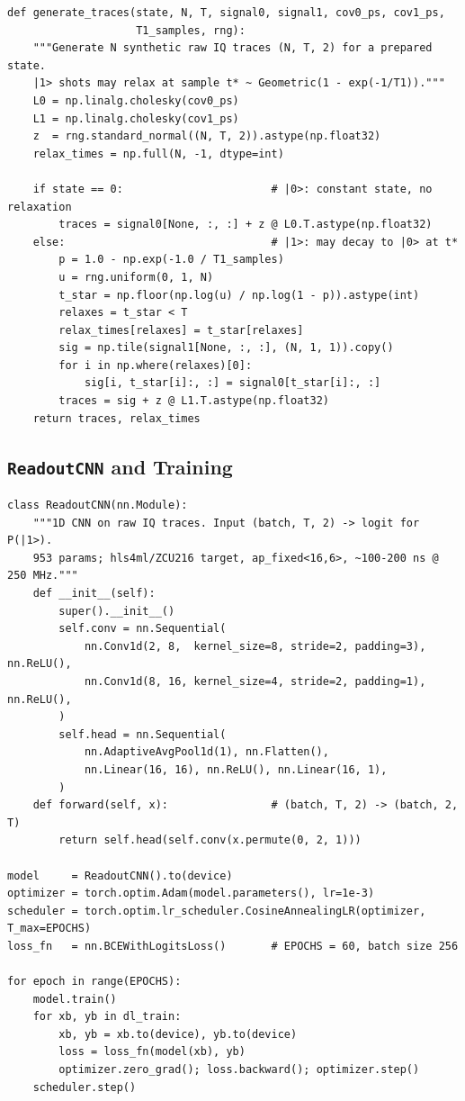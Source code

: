 \begin{verbatim}
def generate_traces(state, N, T, signal0, signal1, cov0_ps, cov1_ps,
                    T1_samples, rng):
    """Generate N synthetic raw IQ traces (N, T, 2) for a prepared state.
    |1> shots may relax at sample t* ~ Geometric(1 - exp(-1/T1))."""
    L0 = np.linalg.cholesky(cov0_ps)
    L1 = np.linalg.cholesky(cov1_ps)
    z  = rng.standard_normal((N, T, 2)).astype(np.float32)
    relax_times = np.full(N, -1, dtype=int)

    if state == 0:                       # |0>: constant state, no relaxation
        traces = signal0[None, :, :] + z @ L0.T.astype(np.float32)
    else:                                # |1>: may decay to |0> at t*
        p = 1.0 - np.exp(-1.0 / T1_samples)
        u = rng.uniform(0, 1, N)
        t_star = np.floor(np.log(u) / np.log(1 - p)).astype(int)
        relaxes = t_star < T
        relax_times[relaxes] = t_star[relaxes]
        sig = np.tile(signal1[None, :, :], (N, 1, 1)).copy()
        for i in np.where(relaxes)[0]:
            sig[i, t_star[i]:, :] = signal0[t_star[i]:, :]
        traces = sig + z @ L1.T.astype(np.float32)
    return traces, relax_times
\end{verbatim}

\subsection{\texttt{ReadoutCNN} and Training}
\label{appendix:cnn_code}

\begin{verbatim}
class ReadoutCNN(nn.Module):
    """1D CNN on raw IQ traces. Input (batch, T, 2) -> logit for P(|1>).
    953 params; hls4ml/ZCU216 target, ap_fixed<16,6>, ~100-200 ns @ 250 MHz."""
    def __init__(self):
        super().__init__()
        self.conv = nn.Sequential(
            nn.Conv1d(2, 8,  kernel_size=8, stride=2, padding=3), nn.ReLU(),
            nn.Conv1d(8, 16, kernel_size=4, stride=2, padding=1), nn.ReLU(),
        )
        self.head = nn.Sequential(
            nn.AdaptiveAvgPool1d(1), nn.Flatten(),
            nn.Linear(16, 16), nn.ReLU(), nn.Linear(16, 1),
        )
    def forward(self, x):                # (batch, T, 2) -> (batch, 2, T)
        return self.head(self.conv(x.permute(0, 2, 1)))

model     = ReadoutCNN().to(device)
optimizer = torch.optim.Adam(model.parameters(), lr=1e-3)
scheduler = torch.optim.lr_scheduler.CosineAnnealingLR(optimizer, T_max=EPOCHS)
loss_fn   = nn.BCEWithLogitsLoss()       # EPOCHS = 60, batch size 256

for epoch in range(EPOCHS):
    model.train()
    for xb, yb in dl_train:
        xb, yb = xb.to(device), yb.to(device)
        loss = loss_fn(model(xb), yb)
        optimizer.zero_grad(); loss.backward(); optimizer.step()
    scheduler.step()
\end{verbatim}

